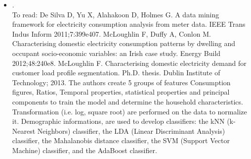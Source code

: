 \begin{itemize}
	\item {}.\\
	 To read: De Silva D, Yu X, Alahakoon D, Holmes G. A data mining framework for electricity consumption analysis from meter data. IEEE Trans Indus Inform 2011;7:399e407.
	 McLoughlin F, Duffy A, Conlon M. Characterising domestic electricity consumption patterns by dwelling and occupant socio-economic variables: an Irish case study. Energy Build 2012;48:240e8.
	 McLoughlin F. Characterising domestic electricity demand for customer load profile segmentation. Ph.D. thesis. Dublin Institute of Technology; 2013.
	 The authors create 5 groups of features Consumption figures, Ratios, Temporal properties, statistical properties and principal components to train the model and determine the household characteristics. Transformation (i.e. log, square root) are performed on the data to normalize it. Demographic informations, are used to develop classifiers: the kNN (k-Nearest Neighbors) classifier, the LDA (Linear Discriminant Analysis) classifier, the Mahalanobis distance classifier, the SVM (Support Vector Machine) classifier, and the AdaBoost classifier.
	
\end{itemize}